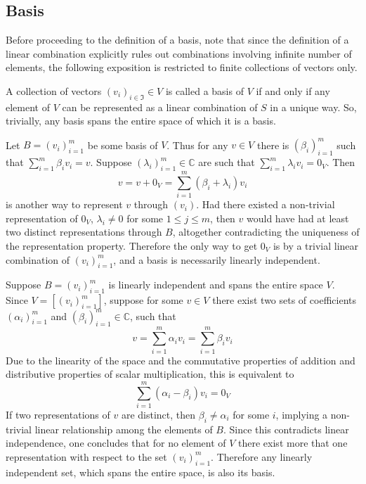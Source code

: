 \documentclass[a4paper]{article}
\newcommand{\brac}[1]{\ensuremath{\left( #1 \right)}}
\newcommand{\spn}[1]{\ensuremath{\left[ #1 \right]}}
\begin{document}


\subsection{Basis} %
\label{ssub:basis}
Before proceeding to the definition of a basis, note that since the definition of a linear combination explicitly rules out combinations involving infinite number of elements, the following exposition is restricted to finite collections of vectors only.

A collection of vectors $\brac{v_i}_{i\in \mathfrak{I}} \in V$ is called a basis of $V$ if and only if any element of $V$ can be represented as a linear combination of $S$ in a unique way. So, trivially, any basis spans the entire space of which it is a basis.

Let $B = \brac{v_i}_{i=1}^m$ be some basis of $V$. Thus for any $v\in V$ there is $\brac{\beta_i}_{i=1}^m$ such that $\sum_{i=1}^m \beta_i v_i = v$. Suppose $\brac{\lambda_i}_{i=1}^m \in \mathbb{C}$ are such that $\sum_{i=1}^m \lambda_i v_i = 0_V$. Then \[ v = v + 0_V = \sum_{i=1}^m \brac{ \beta_i + \lambda_i } v_i\] is another way to represent $v$ through $\brac{v_i}$. Had there existed a non-trivial representation of $0_V$, $\lambda_i \neq 0$ for some $1 \leq j\leq m$, then $v$ would have had at least two distinct representations through $B$, altogether contradicting the uniqueness of the representation property. Therefore the only way to get $0_V$ is by a trivial linear combination of $\brac{v_i}_{i=1}^m$, and a basis is necessarily linearly independent.

Suppose $B = \brac{v_i}_{i=1}^m$ is linearly independent and spans the entire space $V$. Since $V = \spn{\brac{v_i}_{i=1}^m}$, suppose for some $v \in V$ there exist two sets of coefficients $\brac{\alpha_i}_{i=1}^m$ and $\brac{\beta_i}_{i=1}^m \in \mathbb{C}$, such that \[v = \sum_{i=1}^m \alpha_i v_i = \sum_{i=1}^m \beta_i v_i\] Due to the linearity of the space and the commutative properties of addition and distributive properties of scalar multiplication, this is equivalent to \[\sum_{i=1}^m \brac{\alpha_i - \beta_i} v_i = 0_V\] If two representations of $v$ are distinct, then $\beta_i \neq \alpha_i$ for some $i$, implying a non-trivial linear relationship among the elements of $B$. Since this contradicts linear independence, one concludes that for no element of $V$ there exist more that one representation with respect to the set $\brac{v_i}_{i=1}^m$. Therefore any linearly independent set, which spans the entire space, is also its basis.
\end{document}
